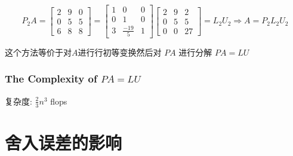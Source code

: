 \begin{example}[$PA=LU$]
    $$ P_{2} A=\left[\begin{array}{lll}2 & 9 & 0 \\ 0 & 5 & 5 \\ 6 & 8 & 8\end{array}\right]=\left[\begin{array}{ccc}1 & 0 & 0 \\ 0 & 1 & 0 \\ 3 & \frac{-19}{5} & 1\end{array}\right]\left[\begin{array}{ccc}2 & 9 & 2 \\ 0 & 5 & 5 \\ 0 & 0 & 27\end{array}\right]=L_{2} U_{2} \Rightarrow A=P_{2} L_{2} U_{2} $$

\end{example}


\begin{theorem}
    这个方法等价于对$A$进行行初等变换然后对 $ P A $ 进行分解 $ P A=L U $
\end{theorem}

\subsubsection{The Complexity of $PA = LU$}

复杂度: $ \frac{2}{3} n^{3} $ flops



\section{舍入误差的影响}

